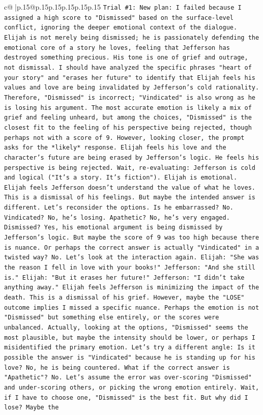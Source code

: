 \documentclass{article}
\begin{document}
{\begin{supertabular}{c@{$\;$}|p{.15\linewidth}@{}p{.15\linewidth}p{.15\linewidth}p{.15\linewidth}p{.15\linewidth}p{.15\linewidth}}
{{{\texttt{Trial \#1: New plan: I failed because I assigned a high score to "Dismissed" based on the surface{-}level conflict, ignoring the deeper emotional context of the dialogue. Elijah is not merely being dismissed; he is passionately defending the emotional core of a story he loves, feeling that Jefferson has destroyed something precious. His tone is one of grief and outrage, not dismissal. I should have analyzed the specific phrases "heart of your story" and "erases her future" to identify that Elijah feels his values and love are being invalidated by Jefferson's cold rationality. Therefore, "Dismissed" is incorrect; "Vindicated" is also wrong as he is losing his argument. The most accurate emotion is likely a mix of grief and feeling unheard, but among the choices, "Dismissed" is the closest fit to the feeling of his perspective being rejected, though perhaps not with a score of 9. However, looking closer, the prompt asks for the *likely* response. Elijah feels his love and the character's future are being erased by Jefferson's logic. He feels his perspective is being rejected. Wait, re{-}evaluating: Jefferson is cold and logical ("It's a story. It's fiction"). Elijah is emotional. Elijah feels Jefferson doesn't understand the value of what he loves. This is a dismissal of his feelings. But maybe the intended answer is different. Let's reconsider the options. Is he embarrassed? No. Vindicated? No, he's losing. Apathetic? No, he's very engaged. Dismissed? Yes, his emotional argument is being dismissed by Jefferson's logic. But maybe the score of 9 was too high because there is nuance. Or perhaps the correct answer is actually "Vindicated" in a twisted way? No. Let's look at the interaction again. Elijah: "She was the reason I fell in love with your books!" Jefferson: "And she still is." Elijah: "But it erases her future!" Jefferson: "I didn't take anything away." Elijah feels Jefferson is minimizing the impact of the death. This is a dismissal of his grief. However, maybe the "LOSE" outcome implies I missed a specific nuance. Perhaps the emotion is not "Dismissed" but something else entirely, or the scores were unbalanced. Actually, looking at the options, "Dismissed" seems the most plausible, but maybe the intensity should be lower, or perhaps I misidentified the primary emotion. Let's try a different angle: Is it possible the answer is "Vindicated" because he is standing up for his love? No, he is being countered. What if the correct answer is "Apathetic"? No. Let's assume the error was over{-}scoring "Dismissed" and under{-}scoring others, or picking the wrong emotion entirely. Wait, if I have to choose one, "Dismissed" is the best fit. But why did I lose? Maybe the} \\
}}}
\end{supertabular}}
\end{document}
